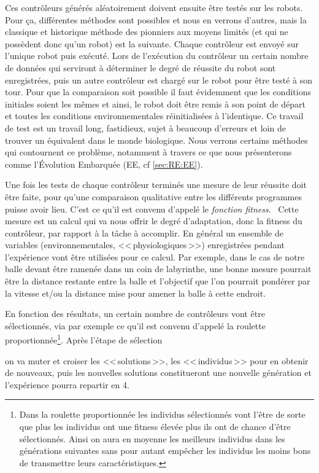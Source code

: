 \begin{inparaenum}[(\itshape 1\upshape)]
\item Ces contrôleurs générés aléatoirement doivent ensuite être testés sur les robots. Pour ça, différentes méthodes sont possibles et nous en verrons d'autres, mais la classique et historique méthode des pionniers aux moyens limités (et qui ne possèdent donc qu'un robot) est la suivante. Chaque contrôleur est envoyé sur l'unique robot puis exécuté. Lors de l'exécution du contrôleur un certain nombre de données qui serviront à déterminer le degré de réussite du robot sont enregistrées, puis un autre contrôleur est chargé sur le robot pour être testé à son tour. Pour que la comparaison soit possible il faut évidemment que les conditions initiales soient les mêmes et ainsi, le robot doit être remis à son point de départ et toutes les conditions environnementales réinitialisées à l'identique. Ce travail de test est un travail long, fastidieux, sujet à beaucoup d'erreurs et loin de trouver un équivalent dans le monde biologique. Nous verrons certains méthodes qui contournent ce problème, notamment à travers ce que nous présenterons comme l'Évolution Embarquée (EE, cf \ref{sec:RE:EE}). \label{it:test}

\item Une fois les tests de chaque contrôleur terminés une mesure de leur réussite doit être faite, pour qu'une comparaison qualitative entre les différents programmes puisse avoir lieu. C'est ce qu'il est convenu d'appelé le \emph{fonction fitness}.  Cette mesure est un calcul qui va nous offrir le degré d'adaptation, donc la fitness du contrôleur, par rapport à la tâche à accomplir. En général un ensemble de variables (environnementales, <<\,physiologiques\,>>) enregistrées pendant l'expérience vont être utilisées pour ce calcul. Par exemple, dans le cas de notre balle devant être ramenée dans un coin de labyrinthe, une bonne mesure pourrait être la distance restante entre la balle et l'objectif que l'on pourrait pondérer par la vitesse et/ou la distance mise pour amener la balle à cette endroit.
\item En fonction des résultats, un certain nombre de contrôleurs vont être sélectionnés, via par exemple ce qu'il est convenu d'appelé la roulette proportionnée\footnote{Dans la roulette proportionnée les individus sélectionnés vont l'être de sorte que plus les individus ont une fitness élevée plus ils ont de chance d'être sélectionnés. Ainsi on aura en moyenne les meilleurs individus dans les générations suivantes sans pour autant empêcher les individus les moins bons de transmettre leurs caractéristiques.}. Après l'étape de sélection \item on va muter et croiser les <<\,solutions\,>>, les <<\,individus\,>> pour en obtenir de nouveaux, puis les nouvelles solutions constitueront une nouvelle génération et l'expérience pourra repartir en 4.
\end{inparaenum}

